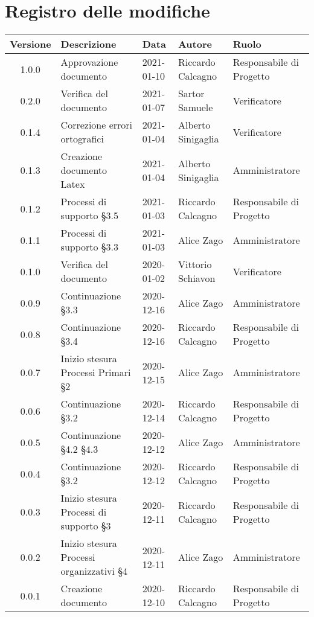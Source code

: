 \section*{Registro delle modifiche}

\begin{center}
	\begin{longtable}{|c|p{4cm}|p{2cm}|p{2cm}|p{3cm}|}
	\hline
	\rowcolor{lighter-grayer}
	\textbf{Versione} & \textbf{Descrizione} & \textbf{Data} & \textbf{Autore} & \textbf{Ruolo} \\
	\hline
	\endfirsthead


	1.0.0 & Approvazione documento & 2021-01-10 & Riccardo Calcagno & Responsabile di Progetto \\
	\hline
	0.2.0 & Verifica del documento & 2021-01-07 & Sartor Samuele & Verificatore \\
	\hline
	0.1.4 & Correzione errori ortografici & 2021-01-04 & Alberto Sinigaglia & Verificatore \\
	\hline
	0.1.3 & Creazione documento Latex & 2021-01-04 & Alberto Sinigaglia & Amministratore \\
	\hline
	0.1.2 & Processi di supporto §3.5 & 2021-01-03 & Riccardo Calcagno & Responsabile di Progetto \\
	\hline
	0.1.1 & Processi di supporto §3.3 & 2021-01-03 & Alice Zago & Amministratore \\
	\hline
	0.1.0 & Verifica del documento & 2020-01-02 & Vittorio Schiavon & Verificatore \\
	\hline
	0.0.9 & Continuazione §3.3 & 2020-12-16 & Alice Zago & Amministratore \\
	\hline
	0.0.8 & Continuazione §3.4 & 2020-12-16 & Riccardo Calcagno & Responsabile di Progetto \\
	\hline
	0.0.7 & Inizio stesura Processi Primari §2 & 2020-12-15 & Alice Zago & Amministratore \\
	\hline
	0.0.6 & Continuazione §3.2 & 2020-12-14 & Riccardo Calcagno & Responsabile di Progetto\\
	\hline
	0.0.5 & Continuazione §4.2 §4.3 & 2020-12-12 & Alice Zago & Amministratore \\
	\hline
	0.0.4 & Continuazione §3.2 & 2020-12-12 & Riccardo Calcagno & Responsabile di Progetto \\
	\hline
	0.0.3 & Inizio stesura Processi di supporto §3 & 2020-12-11 & Riccardo Calcagno & Responsabile di Progetto \\
	\hline
	0.0.2 & Inizio stesura Processi organizzativi §4  & 2020-12-11 & Alice Zago & Amministratore \\
	\hline
	0.0.1 & Creazione documento & 2020-12-10 & Riccardo Calcagno & Responsabile di Progetto \\
	\hline

	\end{longtable}
\end{center}